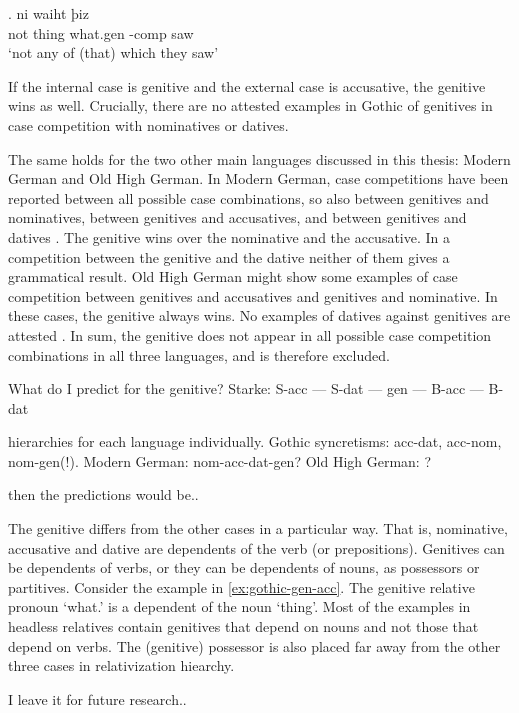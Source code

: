 \exg. ni waiht þiz  \\
 not thing\scsub{[gen]} what.\ac{gen} -\ac{comp} saw\scsub{[acc]}\\
 `not any of (that) which they saw' \label{ex:gothic-gen-acc}

If the internal case is genitive and the external case is accusative, the genitive wins as well. Crucially, there are no attested examples in Gothic of genitives in case competition with nominatives or datives.

The same holds for the two other main languages discussed in this thesis: Modern German and Old High German.
In Modern German, case competitions have been reported between all possible case combinations, so also between genitives and nominatives, between genitives and accusatives, and between genitives and datives \citep[cf.][]{vogel2001}. The genitive wins over the nominative and the accusative. In a competition between the genitive and the dative neither of them gives a grammatical result.
Old High German might show some examples of case competition between genitives and accusatives and genitives and nominative. In these cases, the genitive always wins. No examples of datives against genitives are attested \citep{behaghel1923}.
In sum, the genitive does not appear in all possible case competition combinations in all three languages, and is therefore excluded.

What do I predict for the genitive? Starke: S-acc --- S-dat --- gen --- B-acc --- B-dat

hierarchies for each language individually. Gothic syncretisms: acc-dat, acc-nom, nom-gen(!). Modern German: nom-acc-dat-gen? Old High German: ?

then the predictions would be..

The genitive differs from the other cases in a particular way. That is, nominative, accusative and dative are dependents of the verb (or prepositions). Genitives can be dependents of verbs, or they can be dependents of nouns, as possessors or partitives. Consider the example in \ref{ex:gothic-gen-acc}. The genitive relative pronoun  `what.' is a dependent of the noun  `thing'. Most of the examples in headless relatives contain genitives that depend on nouns and not those that depend on verbs. The (genitive) possessor is also placed far away from the other three cases in  relativization hiearchy.

I leave it for future research..

